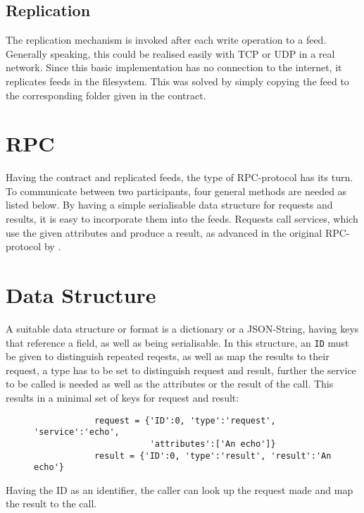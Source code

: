\subsection{Replication}
The replication mechanism is invoked after each write operation to a feed. Generally speaking, this could be realised easily with TCP or UDP in a real network. Since this basic implementation has no connection to the internet, it replicates feeds in the filesystem. This was solved by simply copying the feed to the corresponding folder given in the contract.
\section{RPC}
Having the contract and replicated feeds, the type of RPC-protocol has its turn. To communicate between two participants, four general methods are needed as listed below. By having a simple serialisable data structure for requests and results, it is easy to incorporate them into the feeds. Requests call services, which use the given attributes and produce a result, as advanced in the original RPC-protocol by \citet{birrell1984implementing}.
\section{Data Structure}
A suitable data structure or format is a dictionary or a JSON-String, having keys that reference a field, as well as being serialisable. In this structure, an \lstinline{ID} must be given to distinguish repeated reqests, as well as map the results to their request, a type has to be set to distinguish request and result, further the service to be called is needed as well as the attributes or the result of the call. This results in a minimal set of keys for request and result:\\

\begin{figure}
    
        \begin{lstlisting}
            request = {'ID':0, 'type':'request', 'service':'echo', 
                       'attributes':['An echo']}
            result = {'ID':0, 'type':'result', 'result':'An echo'}
            \end{lstlisting}
    
\end{figure}



Having the ID as an identifier, the caller can look up the request made and map the result to the call.
